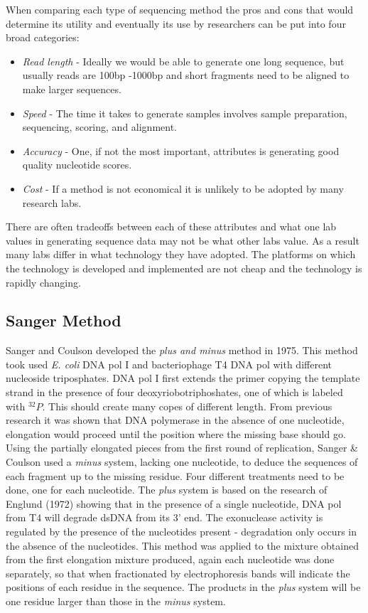 \documentclass{report}\usepackage[]{graphicx}\usepackage[]{color}
\begin{document}
When comparing each type of sequencing method the pros and cons that would determine its utility and
eventually its use by researchers can be put into four broad categories:
\begin{itemize}
\item{\textit{Read length}} - Ideally we would be able to generate one long sequence, 
but usually reads are 100bp -1000bp and short fragments need to be aligned to make larger sequences.
\item{\textit{Speed}} - The time it takes to generate samples involves sample preparation, sequencing, scoring, and
alignment.
\item{\textit{Accuracy}} - One, if not the most important, attributes is generating good quality nucleotide scores. 
\item{\textit{Cost}} - If a method is not economical it is unlikely to be adopted by many research labs.
\end{itemize}
There are often tradeoffs between each of these attributes and what one lab values in generating sequence
data may not be what other labs value. As a result many labs differ in what technology they have adopted. The
platforms on which the technology is developed and implemented are not cheap and the technology is rapidly
changing. 



\subsection*{Sanger Method}
Sanger and Coulson developed the \textit{plus and minus} method in 1975. 
This method took used \textit{E. coli}
DNA pol I and bacteriophage T4 DNA pol with different nucleoside triposphates. 
DNA pol I first extends the primer copying the template strand in the presence of four 
deoxyriobotriphoshates, one of which is labeled with $^{32}P$.
This should create many copes of different length. From previous research it was 
shown that DNA polymerase in
the absence of one nucleotide, elongation would proceed until the 
position where the missing base should go. 
Using the partially elongated pieces from the first round of replication, Sanger \& Coulson 
used a \textit{minus} system, lacking one nucleotide, to deduce the sequences of each 
fragment up to the missing residue. Four different treatments
need to be done, one for each nucleotide. The \textit{plus} system is based on the 
research of Englund (1972) showing
that in the presence of a single nucleotide, DNA pol from T4 will 
degrade dsDNA from its 3' end. The exonuclease
activity is regulated by the presence of the nucleotides 
present - degradation only occurs in the absence of the 
nucleotides. This method was applied to the mixture obtained from 
the first elongation mixture produced, again
each nucleotide was done separately, so that when fractionated by 
electrophoresis bands will indicate the positions
of each residue in the sequence. The products in the \textit{plus} 
system will be one residue larger than those in 
the \textit{minus} system. 
\end{document}
